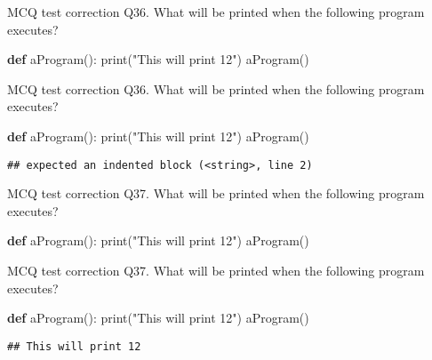 \documentclass[
  8pt,
  ignorenonframetext,
]{beamer}
\newenvironment{Shaded}{\begin{snugshade}}{\end{snugshade}}
\newcommand{\BuiltInTok}[1]{#1}
\newcommand{\KeywordTok}[1]{\textcolor[rgb]{0.13,0.29,0.53}{\textbf{#1}}}
\newcommand{\NormalTok}[1]{#1}
\newcommand{\StringTok}[1]{\textcolor[rgb]{0.31,0.60,0.02}{#1}}
\begin{document}
\begin{frame}[fragile]{MCQ test correction}
\protect\hypertarget{mcq-test-correction-70}{}
Q36. What will be printed when the following program executes?

\begin{Shaded}
\begin{Highlighting}[]
\KeywordTok{def}\NormalTok{ aProgram():}
\BuiltInTok{print}\NormalTok{(}\StringTok{"This will print 12"}\NormalTok{)}
\NormalTok{aProgram()}
\end{Highlighting}
\end{Shaded}
\end{frame}

\begin{frame}[fragile]{MCQ test correction}
\protect\hypertarget{mcq-test-correction-71}{}
Q36. What will be printed when the following program executes?

\begin{Shaded}
\begin{Highlighting}[]
\KeywordTok{def}\NormalTok{ aProgram():}
\BuiltInTok{print}\NormalTok{(}\StringTok{"This will print 12"}\NormalTok{)}
\NormalTok{aProgram()}
\end{Highlighting}
\end{Shaded}

\begin{verbatim}
## expected an indented block (<string>, line 2)
\end{verbatim}
\end{frame}

\begin{frame}[fragile]{MCQ test correction}
\protect\hypertarget{mcq-test-correction-72}{}
Q37. What will be printed when the following program executes?

\begin{Shaded}
\begin{Highlighting}[]
\KeywordTok{def}\NormalTok{ aProgram():}
    \BuiltInTok{print}\NormalTok{(}\StringTok{"This will print 12"}\NormalTok{)}
\NormalTok{aProgram()}
\end{Highlighting}
\end{Shaded}
\end{frame}

\begin{frame}[fragile]{MCQ test correction}
\protect\hypertarget{mcq-test-correction-73}{}
Q37. What will be printed when the following program executes?

\begin{Shaded}
\begin{Highlighting}[]
\KeywordTok{def}\NormalTok{ aProgram():}
    \BuiltInTok{print}\NormalTok{(}\StringTok{"This will print 12"}\NormalTok{)}
\NormalTok{aProgram()}
\end{Highlighting}
\end{Shaded}

\begin{verbatim}
## This will print 12
\end{verbatim}
\end{frame}
\end{document}
